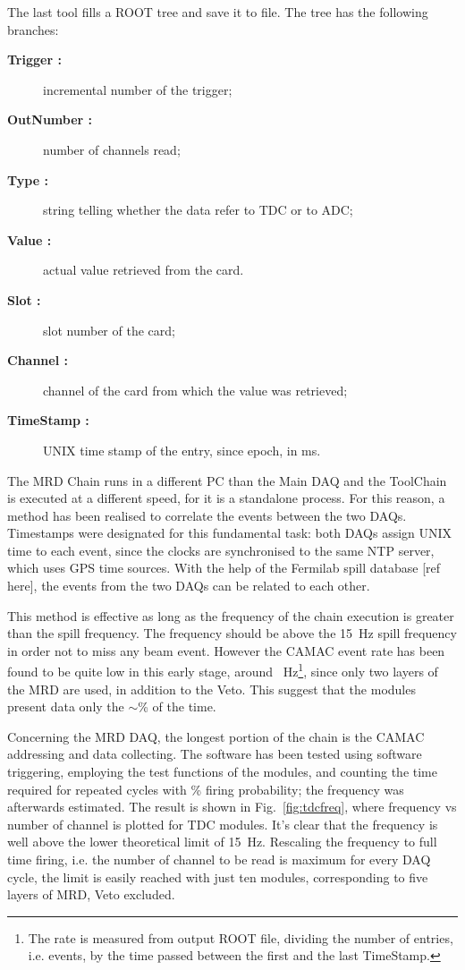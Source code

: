  The last tool fills a ROOT tree and save it to file.
 The tree has the following branches:
 \begin{description}
  \item[\bfseries Trigger :] incremental number of the trigger;
  \item[\bfseries OutNumber :] number of channels read;
  \item[\bfseries Type :] string telling whether the data refer to TDC or to ADC;
  \item[\bfseries Value :] actual value retrieved from the card.
  \item[\bfseries Slot :] slot number of the card;
  \item[\bfseries Channel :] channel of the card from which the value was retrieved;
  \item[\bfseries TimeStamp :] UNIX time stamp of the entry, since epoch, in ms.
\end{description}

 The MRD Chain runs in a different PC than the Main DAQ and the ToolChain %
 is executed at a different speed, for it is a standalone process.
 For this reason, a method has been realised to correlate the events between the two DAQs.
 Timestamps were designated for this fundamental task: both DAQs assign UNIX time to each event, since %
 the clocks are synchronised to the same NTP server, which uses GPS time sources.
 With the help of the Fermilab spill database [ref here], the events from the two DAQs can be related %
 to each other.

 This method is effective as long as the frequency of the chain execution is greater than the %
 spill frequency.
 The frequency should be above the 15~Hz spill frequency in order not to miss any beam event.
 However the CAMAC event rate has been found to be quite low in this %
 early stage, around ~Hz\footnote{The rate is measured from output ROOT file, dividing %
   the number of entries, i.e. events, by the time passed between the first and the last TimeStamp.}, %
 since only two layers of the MRD are used, in addition to the Veto.
 This suggest that the modules present data only the $\sim$\% of the time.
 
 Concerning the MRD DAQ, the longest portion of the chain is the CAMAC addressing and data collecting.
 The software has been tested using software triggering, employing the test functions of the modules, %
 and counting the time required for  repeated cycles with \% firing probability; %
 the frequency was afterwards estimated.
 The result is shown in Fig.~\ref{fig:tdcfreq}, where frequency vs number of channel is %
 plotted for TDC modules.
 It's clear that the frequency is well above the lower theoretical limit of 15~Hz.
 Rescaling the frequency to full time firing, i.e. the number of channel to be read is maximum %
 for every DAQ cycle, the limit is easily reached with just ten modules, corresponding %
 to five layers of MRD, Veto excluded.
 
